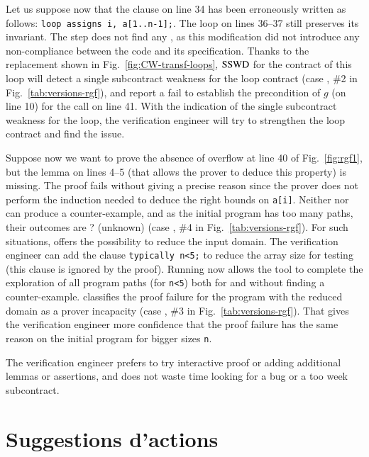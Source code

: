 Let us suppose now that the clause on line 34 has been erroneously
written as follows: \lstinline'loop assigns i, a[1..n-1];'.
The loop on lines 36--37 still preserves its invariant.
The \NCD step does not find any \NCCE, as this modification did not introduce
any non-compliance between the code and its specification.
Thanks to the replacement shown in Fig.~\ref{fig:CW-transf-loops},
$\mathrm{SSWD}$ for the contract of this loop will detect a single
subcontract weakness for the loop contract (case ,
\#2 in Fig.~\ref{tab:versions-rgf}),
and report a fail to establish the 
precondition of $g$ (on line 10) for the call on line 41.
With the indication of the single subcontract weakness for the loop, 
the verification engineer will try to strengthen the loop contract
and find the issue. 


Suppose now we want to prove the absence of overflow at line 40
of Fig.~\ref{fig:rgf1}, but the lemma on lines 4--5 
(that allows the prover to deduce this property) is missing.
The proof fails  without giving a precise reason since
the prover does not perform the induction needed to deduce the right bounds on
\lstinline'a[i]'.
Neither \NCD nor \CWD can produce a counter-example, and
as the initial program has too many paths, their outcomes are \textsf{?}
(unknown) (case , \#4 in Fig.~\ref{tab:versions-rgf}).
For such situations, \stady offers the possibility to reduce the input domain.
The verification engineer can add the \acsl clause 
\lstinline'typically n<5;' to reduce the array size 
for testing (this clause is ignored by the proof). 
Running \stady now allows the tool to complete the exploration of all
program paths (for \lstinline'n<5') both for \NCD and \CWD without finding a counter-example.
\stady classifies the proof failure for the program with 
the reduced domain as a prover incapacity (case ,
\#3 in Fig.~\ref{tab:versions-rgf}).
That gives the verification engineer more confidence that the proof failure
has the same reason on the initial program for bigger sizes \lstinline{n}.

The verification engineer prefers to  try interactive proof or adding additional
lemmas or assertions,
and does not waste time looking for a bug or a too week subcontract.


\section{Suggestions d'actions}
\label{sec:method-suggestions}


